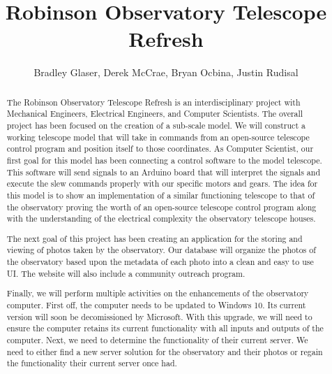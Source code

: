 \documentclass[12pt]{article}
\title{Robinson Observatory Telescope Refresh}
\author{Bradley Glaser, Derek McCrae, Bryan Ocbina, Justin Rudisal}
\begin{document}
\begin{titlingpage}
	\maketitle
\end{titlingpage}


\tableofcontents

\newpage


\onehalfspacing

\begin{abstract}
The Robinson Observatory Telescope Refresh is an interdisciplinary project with Mechanical Engineers, Electrical Engineers, and Computer Scientists. The overall project has been focused on the creation of a sub-scale model. We will construct a working telescope model that will take in commands from an open-source telescope control program and position itself to those coordinates. As Computer Scientist, our first goal for this model has been connecting a control software to the model telescope. This software will send signals to an Arduino board that will interpret the signals and execute the slew commands properly with our specific motors and gears. The idea for this model is to show an implementation of a similar functioning telescope to that of the observatory proving the worth of an open-source telescope control program along with the understanding of the electrical complexity the observatory telescope houses.

The next goal of this project has been creating an application for the storing and viewing of photos taken by the observatory. Our database will organize the photos of the observatory based upon the metadata of each photo into a clean and easy to use UI. The website will also include a community outreach program. 

Finally, we will perform multiple activities on the enhancements of the observatory computer. First off, the computer needs to be updated to Windows 10. Its current version will soon be decomissioned by Microsoft. With this upgrade, we will need to ensure the computer retains its current functionality with all inputs and outputs of the computer. Next, we need to determine the functionality of their current server. We need to either find a new server solution for the observatory and their photos or regain the functionality their current server once had.

\end{abstract}
\end{document}
